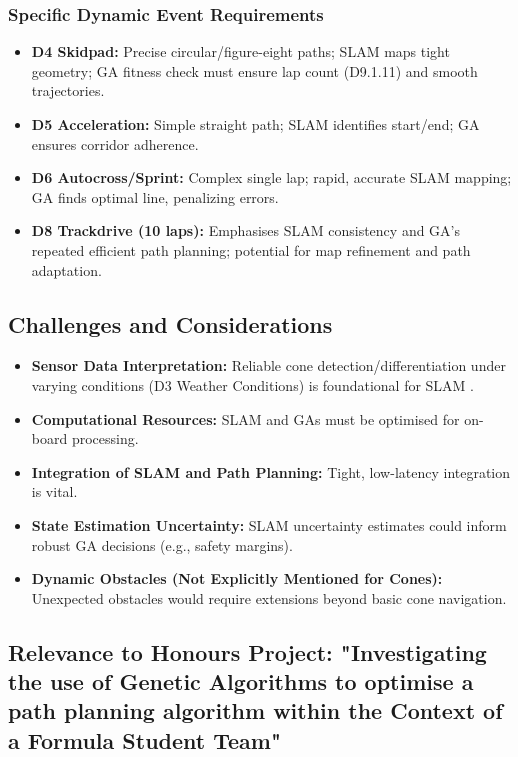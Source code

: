 \subsubsection{Specific Dynamic Event Requirements}
\begin{itemize}
    \item \textbf{D4 Skidpad:} Precise circular/figure-eight paths; SLAM maps tight geometry; GA fitness check must ensure lap count (D9.1.11) and smooth trajectories.
    \item \textbf{D5 Acceleration:} Simple straight path; SLAM identifies start/end; GA ensures corridor adherence.
    \item \textbf{D6 Autocross/Sprint:} Complex single lap; rapid, accurate SLAM mapping; GA finds optimal line, penalizing errors.
    \item \textbf{D8 Trackdrive (10 laps):} Emphasises SLAM consistency and GA's repeated efficient path planning; potential for map refinement and path adaptation.
\end{itemize}

\subsection{Challenges and Considerations}\label{subsec:challenges-and-considerations}
\begin{itemize}
    \item \textbf{Sensor Data Interpretation:} Reliable cone detection/differentiation under varying conditions (D3 Weather Conditions) is foundational for SLAM .
    \item \textbf{Computational Resources:} SLAM and GAs must be optimised for on-board processing.
    \item \textbf{Integration of SLAM and Path Planning:} Tight, low-latency integration is vital.
    \item \textbf{State Estimation Uncertainty:} SLAM uncertainty estimates could inform robust GA decisions (e.g., safety margins).
    \item \textbf{Dynamic Obstacles (Not Explicitly Mentioned for Cones):} Unexpected obstacles would require extensions beyond basic cone navigation.
\end{itemize}

\subsection{Relevance to Honours Project: "Investigating the use of Genetic Algorithms to optimise a path planning algorithm within the Context of a Formula Student Team"}\label{subsec:relevance-to-honours-project:-"investigating-the-use-of-genetic-algorithms-to-optimise-a-path-planning-algorithm-within-the-context-of-a-formula-student-team"}

